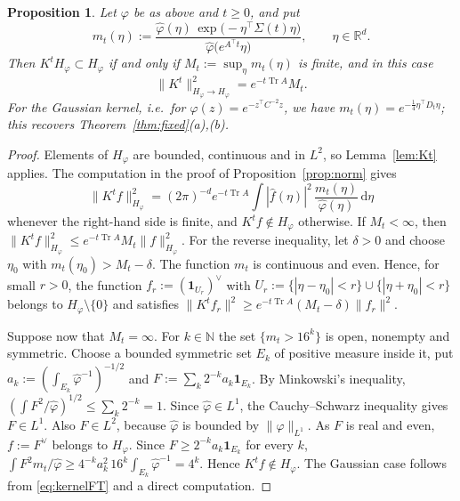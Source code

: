 \documentclass[11pt]{amsart}
\numberwithin{equation}{section}
\newtheorem{proposition}[theorem]{Proposition}
\theoremstyle{definition}
\theoremstyle{remark}
\newcommand{\R}{\mathbb{R}}
\newcommand{\Tr}{\operatorname{Tr}}
\newcommand{\dd}{\,\mathrm{d}}
\newcommand{\hatf}[1]{\widehat{#1}}
\newcommand{\tp}{\top}
\begin{document}
\begin{proposition}\label{prop:general}
Let $\varphi$ be as above and $t\ge0$, and put
\[
m_t(\eta):=\frac{\hatf\varphi(\eta)\,\exp\bigl(-\eta^\tp\Sigma(t)\eta\bigr)}{\hatf\varphi\bigl(e^{A^\tp t}\eta\bigr)},\qquad\eta\in\R^d .
\]
Then $K^tH_\varphi\subset H_\varphi$ if and only if $M_t:=\sup_\eta m_t(\eta)$ is finite, and in this case
\[
\|K^t\|_{H_\varphi\to H_\varphi}^2=e^{-t\Tr A}M_t .
\]
For the Gaussian kernel, i.e.\ for $\varphi(z)=e^{-z^\tp C^{-2}z}$, we have $m_t(\eta)=e^{-\frac14\eta^\tp D_t\eta}$;
this recovers Theorem~\ref{thm:fixed}(a),(b).
\end{proposition}

\begin{proof}
Elements of $H_\varphi$ are bounded, continuous and in $L^2$, so Lemma~\ref{lem:Kt} applies. The computation in the proof
of Proposition~\ref{prop:norm} gives
\[
\|K^tf\|_{H_\varphi}^2=(2\pi)^{-d}e^{-t\Tr A}\int|\hatf f(\eta)|^2\,\frac{m_t(\eta)}{\hatf\varphi(\eta)}\dd\eta
\]
whenever the right-hand side is finite, and $K^tf\notin H_\varphi$ otherwise. If $M_t<\infty$, then
$\|K^tf\|_{H_\varphi}^2\le e^{-t\Tr A}M_t\|f\|_{H_\varphi}^2$. For the reverse inequality, let $\delta>0$ and choose
$\eta_0$ with $m_t(\eta_0)>M_t-\delta$. The function $m_t$ is continuous and even. Hence, for small $r>0$, the
function $f_r:=(\mathbf 1_{U_r})^\vee$ with $U_r:=\{|\eta-\eta_0|<r\}\cup\{|\eta+\eta_0|<r\}$ belongs to
$H_\varphi\setminus\{0\}$ and satisfies $\|K^tf_r\|^2\ge e^{-t\Tr A}(M_t-\delta)\|f_r\|^2$.

Suppose now that $M_t=\infty$. For $k\in\mathbb N$ the set $\{m_t>16^k\}$ is open, nonempty and symmetric. Choose a
bounded symmetric set $E_k$ of positive measure inside it, put $a_k:=(\int_{E_k}\hatf\varphi^{-1})^{-1/2}$ and
$F:=\sum_k2^{-k}a_k\mathbf 1_{E_k}$. By Minkowski's inequality, $(\int F^2/\hatf\varphi)^{1/2}\le\sum_k2^{-k}=1$.
Since $\hatf\varphi\in L^1$, the Cauchy--Schwarz inequality gives $F\in L^1$. Also $F\in L^2$, because $\hatf\varphi$ is
bounded by $\|\varphi\|_{L^1}$. As $F$ is real and even, $f:=F^\vee$ belongs to $H_\varphi$. Since $F\ge2^{-k}a_k\mathbf 1_{E_k}$ for every
$k$,
$\int F^2m_t/\hatf\varphi\ge4^{-k}a_k^2\,16^k\int_{E_k}\hatf\varphi^{-1}=4^k$. Hence $K^tf\notin H_\varphi$. The
Gaussian case follows from \eqref{eq:kernelFT} and a direct computation.
\end{proof}
\end{document}
